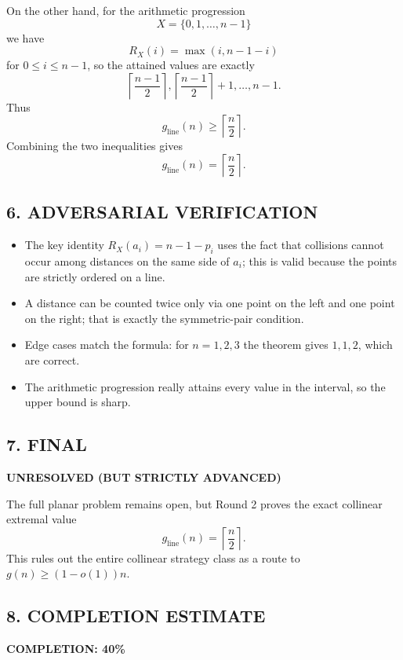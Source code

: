 On the other hand, for the arithmetic progression
\[
X=\{0,1,\dots,n-1\}
\]
we have
\[
R_X(i)=\max(i,n-1-i)
\]
for $0\le i\le n-1$, so the attained values are exactly
\[
\left\lceil\frac{n-1}{2}\right\rceil,\left\lceil\frac{n-1}{2}\right\rceil+1,\dots,n-1.
\]
Thus
\[
g_{\mathrm{line}}(n)\ge \left\lceil\frac{n}{2}\right\rceil.
\]
Combining the two inequalities gives
\[
g_{\mathrm{line}}(n)=\left\lceil\frac{n}{2}\right\rceil.
\]

\subsection*{6. ADVERSARIAL VERIFICATION}

\begin{itemize}
\item The key identity $R_X(a_i)=n-1-p_i$ uses the fact that collisions cannot occur among distances on the same side of $a_i$; this is valid because the points are strictly ordered on a line.
\item A distance can be counted twice only via one point on the left and one point on the right; that is exactly the symmetric-pair condition.
\item Edge cases match the formula: for $n=1,2,3$ the theorem gives $1,1,2$, which are correct.
\item The arithmetic progression really attains every value in the interval, so the upper bound is sharp.
\end{itemize}

\subsection*{7. FINAL}

\textbf{UNRESOLVED (BUT STRICTLY ADVANCED)}

The full planar problem remains open, but Round 2 proves the exact collinear extremal value
\[
g_{\mathrm{line}}(n)=\left\lceil\frac{n}{2}\right\rceil.
\]
This rules out the entire collinear strategy class as a route to $g(n)\ge (1-o(1))n$.

\subsection*{8. COMPLETION ESTIMATE}

\textbf{COMPLETION: 40\%}

